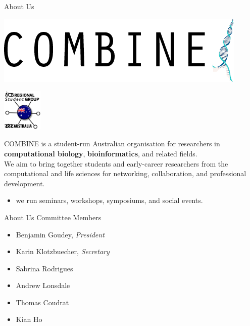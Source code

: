 \documentclass[svgnames]{beamer}
\newcommand{\beamerpurple}[1]{{\usebeamercolor[fg]{title}#1}}
\newcommand{\bp}[1]{{\usebeamercolor[fg]{title}#1}}
\begin{document}
\begin{frame}{About Us}
    \vfill
    \begin{minipage}[c]{\linewidth}
        \centering
        \hfill
        \begin{minipage}[c]{0.45\linewidth}
            \centering
            \includegraphics[width=\linewidth]{./images/COMBINE-logo.png}
        \end{minipage}
        \begin{minipage}[c]{0.45\linewidth}
            \centering
            \includegraphics[height=20mm]{./images/RSGAU-logo.png}
        \end{minipage}
        \hfill
    \end{minipage}
    \vfill
    \beamerpurple{COMBINE} is a student-run Australian organisation for researchers in
    \textbf{computational biology}, \textbf{bioinformatics}, and related
    fields.\\[2ex]
    We aim to bring together students and early-career
    researchers from the computational and life sciences for networking,
    collaboration, and professional development.\\[1ex]
    \begin{itemize}
        \item we run seminars, workshops, symposiums, and social events.
    \end{itemize}
    \vfill
\end{frame}

\begin{frame}{About Us}
    \vfill
    \bp{Committee Members}
    \begin{itemize}
        \item Benjamin Goudey, \emph{President}
        \item Karin Klotzbuecher, \emph{Secretary}
        \item Sabrina Rodrigues
        \item Andrew Lonsdale
        \item Thomas Coudrat
        \item Kian Ho
    \end{itemize}
\end{frame}
\end{document}
